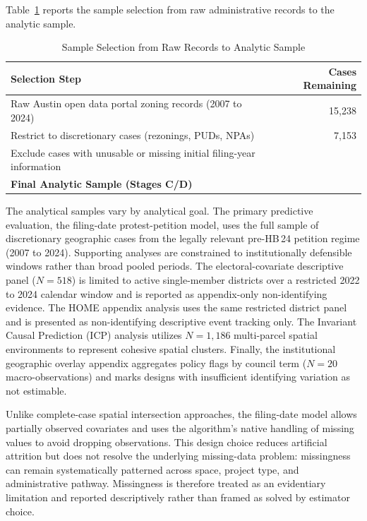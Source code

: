 \documentclass[11pt, letterpaper, oneside]{article}
\begin{document}


Table~\ref{tab:attrition} reports the sample selection from raw administrative records to the analytic sample.

\begin{table}[H]
\centering
\caption{Sample Selection from Raw Records to Analytic Sample}
\label{tab:attrition}
\begin{tabular}{l r}
\toprule
\textbf{Selection Step} & \textbf{Cases Remaining} \\
\midrule
Raw Austin open data portal zoning records (2007 to 2024) & 15,238 \\
Restrict to discretionary cases (rezonings, PUDs, NPAs) & 7,153 \\
Exclude cases with unusable or missing initial filing-year information & \metricBaselineCases{} \\
\midrule
\textbf{Final Analytic Sample (Stages C/D)} & \textbf{\metricBaselineCases{}} \\
\bottomrule
\end{tabular}
\end{table}

The analytical samples vary by analytical goal. The primary predictive evaluation, the filing-date protest-petition model, uses the full sample of \metricBaselineCases{} discretionary geographic cases from the legally relevant pre-HB\,24 petition regime (2007 to 2024). Supporting analyses are constrained to institutionally defensible windows rather than broad pooled periods. The electoral-covariate descriptive panel ($N=518$) is limited to active single-member districts over a restricted 2022 to 2024 calendar window and is reported as appendix-only non-identifying evidence. The HOME appendix analysis uses the same restricted district panel and is presented as non-identifying descriptive event tracking only. The Invariant Causal Prediction (ICP) analysis utilizes $N=1,186$ multi-parcel spatial environments to represent cohesive spatial clusters. Finally, the institutional geographic overlay appendix aggregates policy flags by council term ($N=20$ macro-observations) and marks designs with insufficient identifying variation as not estimable.

Unlike complete-case spatial intersection approaches, the filing-date model allows partially observed covariates and uses the algorithm's native handling of missing values to avoid dropping observations. This design choice reduces artificial attrition but does not resolve the underlying missing-data problem: missingness can remain systematically patterned across space, project type, and administrative pathway. Missingness is therefore treated as an evidentiary limitation and reported descriptively rather than framed as solved by estimator choice.
\end{document}
